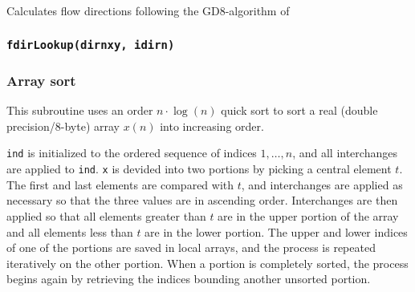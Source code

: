 Calculates flow directions following the GD8-algorithm
of \citet{Paik2008a}


\begin{usessubs}
\end{usessubs}

\subsubsection{\texttt{fdirLookup(dirnxy, idirn)}}


\subsubsection{Array sort}


This subroutine uses an order $n\cdot\log(n)$ quick sort to sort
a real (double precision/8-byte) array $x(n)$ into increasing order.


\texttt{ind} is initialized to the ordered sequence of indices $1,\ldots,n$,
and all interchanges are applied to \texttt{ind}. \texttt{x} is devided
into two portions by picking a central element $t$. The first and
last elements are compared with $t$, and interchanges are applied
as necessary so that the three values are in ascending order. Interchanges
are then applied so that all elements greater than $t$ are in the
upper portion of the array and all elements less than $t$ are in
the lower portion. The upper and lower indices of one of the portions
are saved in local arrays, and the process is repeated iteratively
on the other portion. When a portion is completely sorted, the process
begins again by retrieving the indices bounding another unsorted portion.

